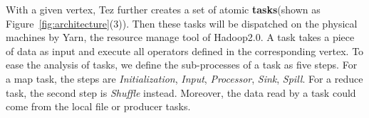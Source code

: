 With a given vertex, Tez further creates a set of atomic \textbf{tasks}(shown as Figure~\ref{fig:architecture}(3)). Then these tasks will be dispatched on the physical machines by Yarn, the resource manage tool of Hadoop2.0. A task takes a piece of data as input and execute all operators defined in the corresponding vertex. To ease the analysis of tasks, we define the sub-processes of a task as five steps. For a map task, the steps are \textit{Initialization}, \textit{Input}, \textit{Processor}, \textit{Sink}, \textit{Spill}. For a reduce task, the second step is \textit{Shuffle} instead. Moreover, the data read by a task could come from the local file or producer tasks.
